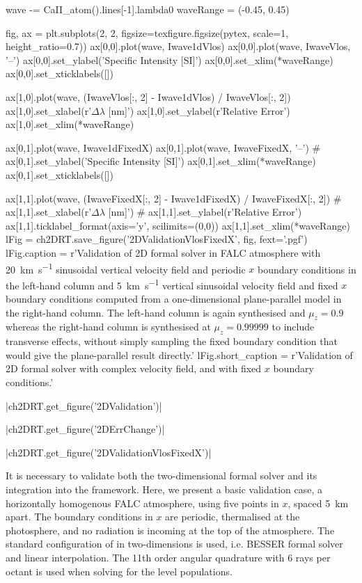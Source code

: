 \begin{pycode}[2DValidation]
wave -= CaII_atom().lines[-1].lambda0
waveRange = (-0.45, 0.45)

fig, ax = plt.subplots(2, 2, figsize=texfigure.figsize(pytex, scale=1, height_ratio=0.7))
ax[0,0].plot(wave, Iwave1dVlos)
ax[0,0].plot(wave, IwaveVlos, '--')
ax[0,0].set_ylabel('Specific Intensity [SI]')
ax[0,0].set_xlim(*waveRange)
ax[0,0].set_xticklabels([])

ax[1,0].plot(wave, (IwaveVlos[:, 2] - Iwave1dVlos) / IwaveVlos[:, 2])
ax[1,0].set_xlabel(r'$\Delta\lambda$ [\si{\nano\metre}]')
ax[1,0].set_ylabel(r'Relative Error')
ax[1,0].set_xlim(*waveRange)

ax[0,1].plot(wave, Iwave1dFixedX)
ax[0,1].plot(wave, IwaveFixedX, '--')
# ax[0,1].set_ylabel('Specific Intensity [SI]')
ax[0,1].set_xlim(*waveRange)
ax[0,1].set_xticklabels([])

ax[1,1].plot(wave, (IwaveFixedX[:, 2] - Iwave1dFixedX) / IwaveFixedX[:, 2])
# ax[1,1].set_xlabel(r'$\Delta\lambda$ [\si{\nano\metre}]')
# ax[1,1].set_ylabel(r'Relative Error')
ax[1,1].ticklabel_format(axis='y', scilimits=(0,0))
ax[1,1].set_xlim(*waveRange)
lFig = ch2DRT.save_figure('2DValidationVlosFixedX', fig, fext='.pgf')
lFig.caption = r'Validation of 2D formal solver in FALC atmosphere with \SI{20}{\kilo\metre\per\second} sinusoidal vertical velocity field and periodic $x$ boundary conditions in the left-hand column and \SI{5}{\kilo\metre\per\second} vertical sinusoidal velocity field and fixed $x$ boundary conditions computed from a one-dimensional plane-parallel model in the right-hand column. The left-hand column is again synthesised and $\mu_z=0.9$ whereas the right-hand column is synthesised at $\mu_z=0.99999$ to include transverse effects, without simply sampling the fixed boundary condition that would give the plane-parallel result directly.'
lFig.short_caption = r'Validation of 2D formal solver with complex velocity field, and with fixed $x$ boundary conditions.'
\end{pycode}

\py[2DValidation]|ch2DRT.get_figure('2DValidation')|

\py[2DValidation]|ch2DRT.get_figure('2DErrChange')|

\py[2DValidation]|ch2DRT.get_figure('2DValidationVlosFixedX')|


It is necessary to validate both the two-dimensional formal solver and its integration into the \Lw{} framework.
Here, we present a basic validation case, a horizontally homogenous FALC atmosphere, using five points in $x$, spaced \SI{5}{\kilo\metre} apart.
The boundary conditions in $x$ are periodic, thermalised at the photosphere, and no radiation is incoming at the top of the atmosphere.
The standard configuration of \Lw{} in two-dimensions is used, i.e. BESSER formal solver and linear interpolation.
The 11th order angular quadrature with 6 rays per octant \citep{Stepan2020} is used when solving for the level populations.

